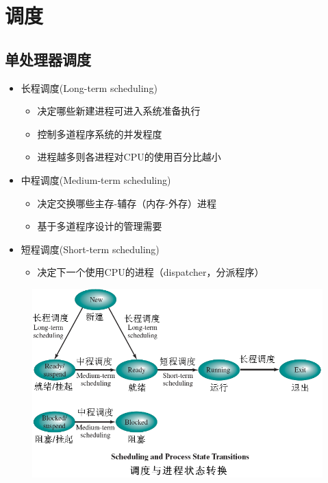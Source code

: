 
\section{调度}
\subsection{单处理器调度}
\begin{itemize}
    \item 长程调度(Long-term scheduling)
    \begin{itemize}
    \item 决定哪些新建进程可进入系统准备执行
    \item 控制多道程序系统的并发程度
    \item 进程越多则各进程对CPU的使用百分比越小
    \end{itemize}
    \item 中程调度(Medium-term scheduling)
    \begin{itemize}
    \item 决定交换哪些主存-辅存（内存-外存）进程
    \item 基于多道程序设计的管理需要
    \end{itemize}
    \item 短程调度(Short-term scheduling)
    \begin{itemize}
    \item 决定下一个使用CPU的进程（dispatcher，分派程序）
    \end{itemize}
\end{itemize}

\begin{figure}[H]
    \centering
    \includegraphics[width=0.8\linewidth]{fig/process_scheduling.png}
\end{figure}


